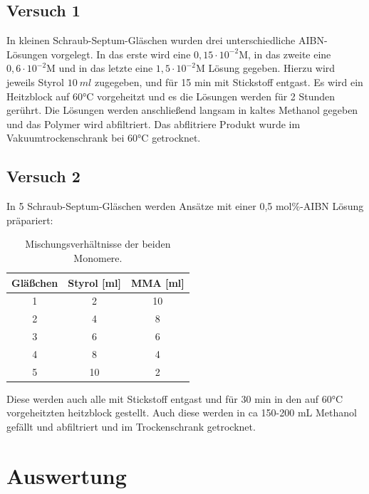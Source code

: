\documentclass[10pt,a4paper,ngerman]{scrartcl}
\begin{document}
	\subsection{Versuch 1}

		In kleinen Schraub-Septum-Gläschen wurden drei unterschiedliche AIBN-Lösungen vorgelegt. 
		In das erste wird eine $0,15\cdot 10^{-2}\text{M}$, in das zweite eine $0,6\cdot 10^{-2}\text{M}$ und in das letzte eine $1,5\cdot 10^{-2}\text{M}$ Lösung gegeben. 
		Hierzu wird jeweils Styrol $\SI{10}{ml}$ zugegeben, und für 15 min mit Stickstoff entgast. 
		Es wird ein Heitzblock auf 60°C vorgeheitzt und es die Lösungen werden für 2 Stunden gerührt.
		Die Lösungen werden anschließend langsam in kaltes Methanol gegeben und das Polymer wird abfiltriert.
		Das abflitriere Produkt wurde im Vakuumtrockenschrank bei 60°C getrocknet.

	\subsection{Versuch 2}

		In 5 Schraub-Septum-Gläschen werden Ansätze mit einer 0,5 mol\%-AIBN Lösung präpariert:

		\begin{table}[htbp]
			\centering
			\caption{Mischungsverhältnisse der beiden Monomere.}
			\label{mischungsverhaeltnisse}
			\begin{tabular}{c|c|c}
					Gläßchen & \textbf{Styrol [ml]} & \textbf{MMA [ml]} \\
					\hline 
					1 & 2                    & 10                \\ 
					2 & 4					 & 8				 \\
					3 & 6                    & 6                 \\ 
					4 & 8                    & 4                 \\ 
					5 & 10                   & 2                 \\ 
			\end{tabular}
		\end{table}
	
	Diese werden auch alle mit Stickstoff entgast und für 30 min in den auf 60°C vorgeheitzten heitzblock gestellt. 
	Auch diese werden in ca 150-200 mL Methanol gefällt und abfiltriert und im Trockenschrank getrocknet.


\section{Auswertung}
\end{document}
